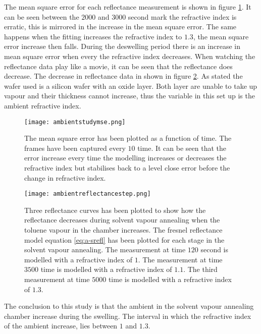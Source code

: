 \documentclass[MasterThesisMain.tex]{subfiles}
\begin{document}
The mean square error for each reflectance measurement is shown in figure \ref{fig:ambientmse}. It can be seen between the $2000$ and $3000$ second mark the refractive index is erratic, this is mirrored in the increase in the mean square error. The same happens when the fitting increases the refractive index to $1.3$, the mean square error increase then falls. During the deswelling period there is an increase in mean square error when every the refractive index decreases. When watching the reflectance data play like a movie, it can be seen that the reflectance does decrease. The decrease in reflectance data in shown in figure \ref{fig:ambientreflectance}. As stated the wafer used is a silicon wafer with an oxide layer. Both layer are unable to take up vapour and their thickness cannot increase, thus the variable in this set up is the ambient refractive index.

\begin{figure}
\centering
\texttt{[image: ambientstudymse.png]}
\caption{The mean square error has been plotted as a function of time. The frames have been captured every $10$ time. It can be seen that the error increase every time the modelling increases or decreases the refractive index but stabilises back to a level close error before the change in refractive index.}
\label{fig:ambientmse}
\end{figure}

\begin{figure}
\centering
\texttt{[image: ambientreflectancestep.png]}
\caption{Three reflectance curves has been plotted to show how the reflectance decreases during solvent vapour annealing when the toluene vapour in the chamber increases. The fresnel reflectance model equation \ref{eq:a-srefl} has been plotted for each stage in the solvent vapour annealing. The measurement at time $120$ second is modelled with a refractive index of $1$. The measurement at time $3500$ time is modelled with a refractive index of $1.1$. The third measurement at time $5000$ time is modelled with a refractive index of $1.3$.}
\label{fig:ambientreflectance}
\end{figure}

The conclusion to this study is that the ambient in the solvent vapour annealing chamber increase during the swelling. The interval in which the refractive index of the ambient increase, lies between $1$ and $1.3$. 
	
\end{document}
